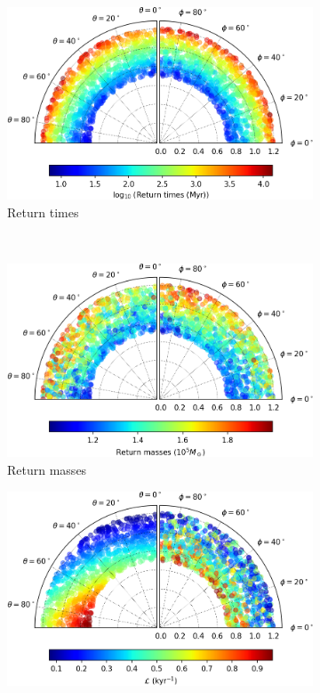 \begin{figure}[h]
    \centering
    \begin{subfigure}[t]{0.4\textwidth}
        \includegraphics[width = \textwidth]{"../Files/Week 13/images/24_time"}
        \caption{Return times}
    \end{subfigure}
    ~ 
    \begin{subfigure}[t]{0.4\textwidth}
        \includegraphics[width=\textwidth]{"../Files/Week 13/images/24_mass"}
        \caption{Return masses}
    \end{subfigure}
    \begin{subfigure}[t]{0.4\textwidth}
        \includegraphics[width=\textwidth]{"../Files/Week 13/images/24_lyapunov"}

\end{subfigure}
\end{figure}
